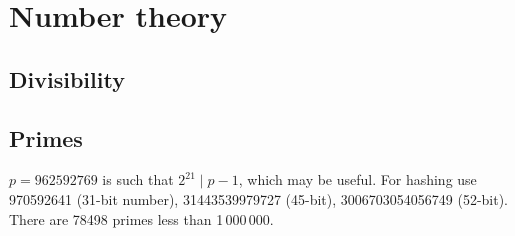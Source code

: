 \chapter{Number theory}



\section{Divisibility}





\section{Primes}
	$p=962592769$ is such that $2^{21} \mid p-1$, which may be useful. For hashing
	use 970592641 (31-bit number), 31443539979727 (45-bit), 3006703054056749
	(52-bit). There are 78498 primes less than 1\,000\,000.

